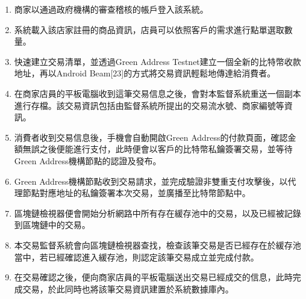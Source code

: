 	\begin{enumerate}
		\item 商家以通過政府機構的審查稽核的帳戶登入該系統。
		\item 系統載入該店家註冊的商品資訊，店員可以依照客戶的需求進行點單選取數量。
		\item 快速建立交易清單，並透過Green Address Testnet建立一個全新的比特幣收款地址，再以Android Beam[23]的方式將交易資訊輕鬆地傳達給消費者。
		\item 在商家店員的平板電腦收到這筆交易信息之後，會對本監督系統重送一個副本進行存檔。該交易資訊包括由監督系統所提出的交易流水號、商家編號等資訊。
		\item 消費者收到交易信息後，手機會自動開啟Green Address的付款頁面，確認金額無誤之後便能進行支付，此時便會以客戶的比特幣私鑰簽署交易，並等待Green Address機構節點的認證及發布。
		\item Green Address機構節點收到交易請求，並完成驗證非雙重支付攻擊後，以代理節點對應地址的私鑰簽署本次交易，並廣播至比特幣節點中。
		\item 區塊鏈檢視器便會開始分析網路中所有存在緩存池中的交易，以及已經被記錄到區塊鏈中的交易。
		\item 本交易監督系統會向區塊鏈檢視器查找，檢查該筆交易是否已經存在於緩存池當中，若已經確認進入緩存池，則認定該筆交易成立並完成付款。
		\item 在交易確認之後，便向商家店員的平板電腦送出交易已經成交的信息，此時完成交易，於此同時也將該筆交易資訊建置於系統數據庫內。
	\end{enumerate}
